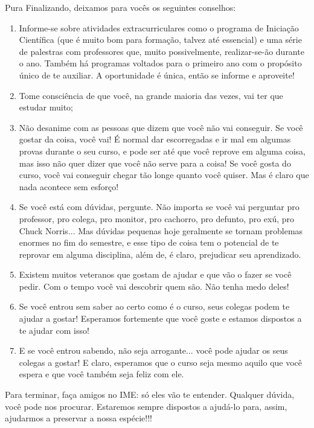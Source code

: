 \begin{subsecao}{Pura}
Finalizando, deixamos para vocês os seguintes conselhos:
\begin{enumerate}

\item Informe-se sobre atividades extracurriculares como o programa de
Iniciação Científica (que é muito bom para formação, talvez até essencial) e
uma série de palestras com professores que, muito possivelmente, realizar-se-ão
durante o ano. Também há programas voltados para o primeiro ano com o propósito único de te auxiliar. A oportunidade é única, então se informe e aproveite!
\item Tome consciência de que você, na grande maioria das vezes, vai ter que
estudar muito;
\item Não desanime com as pessoas que dizem que você não vai conseguir. Se você gostar da coisa, você vai! É normal dar escorregadas e ir mal em algumas provas durante o seu curso, e pode ser até que você reprove em alguma coisa, mas isso não quer dizer que você não serve para a coisa! Se você gosta do curso, você vai conseguir chegar tão longe quanto você quiser. Mas é claro que nada acontece sem esforço!
\item Se você está com dúvidas, pergunte. Não importa se você vai perguntar pro professor, pro colega, pro monitor, pro cachorro, pro defunto, pro exú, pro Chuck Norris... Mas dúvidas pequenas hoje geralmente se tornam problemas enormes no fim do semestre, e esse tipo de coisa tem o potencial de te reprovar em alguma disciplina, além de, é claro, prejudicar seu aprendizado.
\item Existem muitos veteranos que gostam de ajudar e que vão o fazer se você pedir. Com o tempo você vai descobrir quem são. Não tenha medo deles!
\item Se você entrou sem saber ao certo como é o curso, seus colegas podem te ajudar a gostar! Esperamos fortemente que você goste e estamos dispostos a te ajudar com isso!
\item E se você entrou sabendo, não seja arrogante... você pode ajudar os seus colegas a gostar! E claro, esperamos que o curso seja mesmo aquilo que você espera e que você também seja feliz com ele.

\end{enumerate}
Para terminar, faça amigos no IME: só eles vão te entender. Qualquer dúvida,
você pode nos procurar. Estaremos sempre dispostos a ajudá-lo para, assim, ajudarmos a
preservar a nossa espécie!!!

\end{subsecao}
